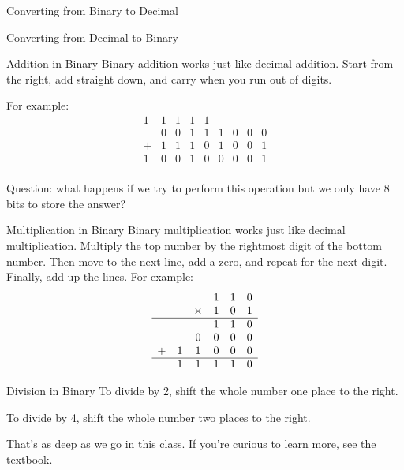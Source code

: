 \begin{frame}{Converting from Binary to Decimal}
\end{frame}

\begin{frame}{Converting from Decimal to Binary}
\end{frame}

\begin{frame}{Addition in Binary}
Binary addition works just like decimal addition. 
Start from the right, add straight down, and carry when you run out of digits.

For example:
\[
\begin{array}{ccccccccc}
    1 & 1 & 1 & 1 & 1 &   &   &   &   \\ 
      & 0 & 0 & 1 & 1 & 1 & 0 & 0 & 0 \\ 
    + & 1 & 1 & 1 & 0 & 1 & 0 & 0 & 1 \\
    \hline
    1 & 0 & 0 & 1 & 0 & 0 & 0 & 0 & 1 \\ 
\end{array}
\]

Question: what happens if we try to perform this operation but we only have 8 bits to store the answer? 
\end{frame}

\begin{frame}{Multiplication in Binary}
Binary multiplication works just like decimal multiplication. 
Multiply the top number by the rightmost digit of the bottom number.
Then move to the next line, add a zero, and repeat for the next digit.
Finally, add up the lines. For example:
\[
\begin{array}{cccccc}
        &   &        & 1 & 1 & 0 \\ 
        &   & \times & 1 & 0 & 1 \\
    \hline
        &   &        & 1 & 1 & 0 \\ 
        &   & 0      & 0 & 0 & 0 \\
        + & 1 & 1      & 0 & 0 & 0 \\
        \hline 
        & 1 & 1      & 1 & 1 & 0 \\
\end{array}
\]
\end{frame}


\begin{frame}{Division in Binary}
To divide by 2, shift the whole number one place to the right.

To divide by 4, shift the whole number two places to the right. 

That's as deep as we go in this class. If you're curious to learn more, see the textbook.

\end{frame}

